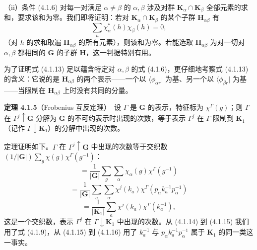 （ii）条件 (4.1.6) 对每一对满足 $\alpha \neq \beta$ 的 $\alpha, \beta$ 涉及对群 $\mathbf{K}_{\alpha} \cap \mathbf{K}_{\beta}$ 全部元素的求和，要求该和为零。我们即将证明：若对 $\mathbf{K}_{\alpha} \cap \mathbf{K}_{\beta}$ 的某个子群 $\mathbf{H}_{\alpha\beta}$ 有
\begin{equation*}
\sum_{h}\chi^{*}_{\alpha}(h)\chi_{\beta}(h) = 0,
\tag{4.1.13}
\end{equation*}
（对 $h$ 的求和取遍 $\mathbf{H}_{\alpha\beta}$ 的所有元素），则该和为零。若能选取 $\mathbf{H}_{\alpha\beta}$ 为对一切对 $\alpha, \beta$ 都相同的 $\mathbf{G}$ 的子群 $\mathbf{H}$，这一判据特别有用。

为了证明式 (4.1.13) 足以蕴含特定对 $\alpha, \beta$ 的式 (4.1.6)，更仔细地考察式 (4.1.13) 的含义：它说的是 $\mathbf{H}_{\alpha\beta}$ 的两个表示——一个以 $\langle \phi_{\alpha r} |$ 为基、另一个以 $\langle \phi_{\beta r} |$ 为基——当限制在 $\mathbf{H}_{\alpha\beta}$ 上时没有共同的分量。

\noindent\textbf{定理 4.1.5}\quad （Frobenius 互反定理）\ 设 $\Gamma$ 是 $\mathbf{G}$ 的表示，特征标为 $\chi^{\Gamma}(g)$；则 $\Gamma$ 在 $\Gamma^{j} \uparrow \mathbf{G}$ 分解为 $\mathbf{G}$ 的不可约表示时出现的次数，等于表示 $\Gamma^{j}$ 在 $\Gamma$ 限制到 $\mathbf{K}_{1}$（记作 $\Gamma \downarrow \mathbf{K}_{1}$）的分解中出现的次数。

定理证明如下。$\Gamma$ 在 $\Gamma^{j} \uparrow \mathbf{G}$ 中出现的次数等于交织数 $(1/|\mathbf{G}|)\sum_{g}\chi(g)\chi^{\Gamma}(g^{-1})$：
\begin{equation*}
= \frac{1}{|\mathbf{G}|}\sum_{g}\sum_{\alpha}\chi_{\alpha}(g)\chi^{\Gamma}(g^{-1})
\tag{4.1.14}
\end{equation*}
\begin{equation*}
= \frac{1}{|\mathbf{G}|}\sum_{a}\sum_{\alpha}\chi^{j}(k_{a})\chi^{\Gamma}(p_{\alpha}k^{-1}_{a}p^{-1}_{\alpha})
\tag{4.1.15}
\end{equation*}
\begin{equation*}
= \frac{1}{|\mathbf{K}_{1}|}\sum_{a}\chi^{j}(k_{a})\chi^{\Gamma}(k^{-1}_{a}),
\tag{4.1.16}
\end{equation*}
这是一个交织数，表示 $\Gamma^{j}$ 在 $\Gamma \downarrow \mathbf{K}_{1}$ 中出现的次数。从 (4.1.14) 到 (4.1.15) 我们用了式 (4.1.9)，从 (4.1.15) 到 (4.1.16) 用了 $k^{-1}_{a}$ 与 $p_{\alpha}k^{-1}_{a}p^{-1}_{\alpha}$ 属于 $\mathbf{K}_{1}$ 的同一类这一事实。
